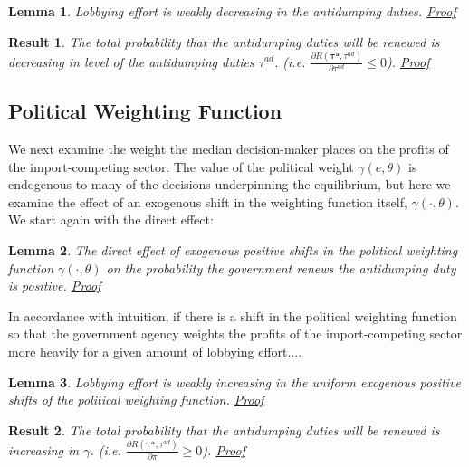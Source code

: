 \documentclass[10pt]{article}
\newtheorem{lemma}{Lemma}
\newtheorem{result}{Result}
\newcommand{\ta}{\theta}
\newcommand{\bta}{\bm{\tau^a}}
\newcommand{\tad}{\tau^{ad}}
\newcommand{\ga}{\gamma}
\begin{document}
\begin{lemma}
  Lobbying effort is weakly decreasing in the antidumping duties. \hyperlink{Pr_tad_indir}{Proof}
  \label{res:tad_indir}
\end{lemma}


\begin{result}
	The total probability that the antidumping duties will be renewed is decreasing in level of the antidumping duties $\tad$. (i.e. $\frac{\partial R(\bta,\tad)}{\partial \tad} \leq 0$). \hyperlink{Pr_tad_total}{Proof}
	\label{res:tad_total}
\end{result}




\bigskip
\subsection{Political Weighting Function}
\label{sec:gamma}

We next examine the weight the median decision-maker places on the profits of the import-competing sector. The value of the political weight $\ga(e,\ta)$ is endogenous to many of the decisions underpinning the equilibrium, but here we examine the effect of an exogenous shift in the weighting function itself, $\ga(\cdot,\ta)$. We start again with the direct effect:

\begin{lemma}
  The direct effect of exogenous positive shifts in the political weighting function $\ga(\cdot,\ta)$ on the probability the government renews the antidumping duty is positive. \hyperlink{Pr_ga_dir}{Proof}
	  \label{res:ga_dir}
\end{lemma}

In accordance with intuition, if there is a shift in the political weighting function so that the government agency weights the profits of the import-competing sector more heavily for a given amount of lobbying effort....


\begin{lemma}
  Lobbying effort is weakly increasing in the uniform exogenous positive shifts of the political weighting function. \hyperlink{Pr_ga_indir}{Proof}
  \label{res:ga_indir}
\end{lemma}


\begin{result}
	The total probability that the antidumping duties will be renewed is increasing in $\ga$. (i.e. $\frac{\partial R(\bta,\tad)}{\partial  \pi} \geq 0$). \hyperlink{Pr_ga_total}{Proof}
	\label{res:ga_total}
\end{result}
\end{document}
